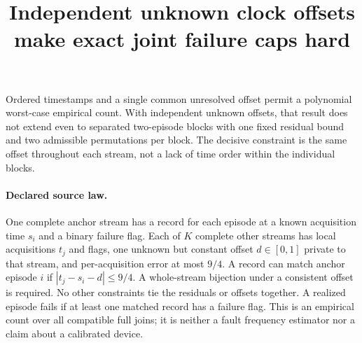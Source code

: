\documentclass[11pt]{article}
\title{Independent unknown clock offsets make exact joint failure caps hard}
\begin{document}
\maketitle

Ordered timestamps and a single common unresolved offset permit
a polynomial worst-case empirical count. With independent unknown
offsets, that result does not extend even to separated two-episode
blocks with one fixed residual bound and two admissible permutations
per block. The decisive constraint is the same offset throughout each
stream, not a lack of time order within the individual blocks.

\paragraph{Declared source law.}
One complete anchor stream has a record for each episode at a known
acquisition time \(s_i\) and a binary failure flag. Each of \(K\)
complete other streams has local acquisitions \(t_j\) and flags,
one unknown but constant offset \(d\in[0,1]\) private to that stream,
and per-acquisition error at most \(9/4\). A record can match anchor
episode \(i\) if \(|t_j-s_i-d|\le9/4\). A whole-stream bijection
under a consistent offset is required. No other constraints tie the
residuals or offsets together. A realized episode fails if at least
one matched record has a failure flag. This is an empirical count
over all compatible full joins; it is neither a fault frequency
estimator nor a claim about a calibrated device.
\end{document}
